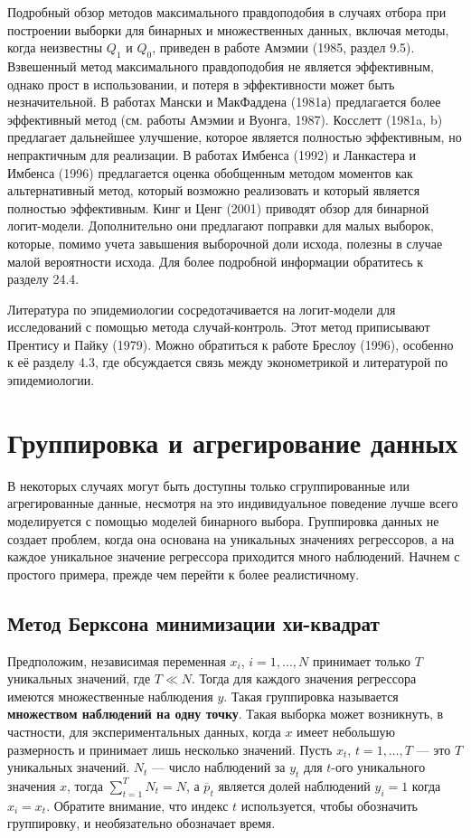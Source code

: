 Подробный обзор   методов максимального правдоподобия в случаях отбора при построении выборки для бинарных и множественных данных,  включая методы,  когда неизвестны $Q_1$ и $Q_0$,  приведен в работе Амэмии (1985,  раздел 9.5). Взвешенный метод максимального правдоподобия не является эффективным,  однако прост в использовании,  и потеря в эффективности может быть незначительной. В работах Мански и МакФаддена (1981а) предлагается более эффективный метод (см. работы Амэмии и Вуонга,  1987). Косслетт (1981a, b) предлагает дальнейшее улучшение,  которое является полностью эффективным,  но непрактичным для реализации. В работах Имбенса  (1992)  и Ланкастера и Имбенса  (1996)  предлагается оценка обобщенным методом моментов как альтернативный метод,  который возможно реализовать и который является полностью эффективным. Кинг и Ценг  (2001)  приводят обзор для бинарной логит-модели. Дополнительно они предлагают поправки для малых выборок, которые,  помимо учета завышения выборочной доли исхода, полезны  в случае малой вероятности исхода. Для более подробной информации обратитесь к разделу 24.4.

Литература по эпидемиологии сосредотачивается на логит-модели для исследований с помощью метода случай-контроль. Этот метод приписывают Прентису и Пайку  (1979). Можно обратиться к работе Бреслоу  (1996),  особенно к её разделу 4.3,  где обсуждается связь между эконометрикой и литературой по эпидемиологии.

\section{ Группировка и агрегирование данных}

В некоторых случаях могут быть доступны только сгруппированные или агрегированные данные,  несмотря на это индивидуальное поведение лучше всего моделируется с помощью моделей бинарного выбора. Группировка данных не создает проблем,  когда она основана на уникальных значениях регрессоров,  а на каждое уникальное значение регрессора приходится много наблюдений.  Начнем с простого примера,  прежде чем перейти к более реалистичному.

\subsection{Метод Берксона минимизации хи-квадрат}

Предположим,  независимая переменная $x_i$, $i=1, \ldots, N$ принимает только $T$ уникальных значений,  где $T\ll N$. Тогда для каждого значения регрессора имеются множественные наблюдения $y$. Такая группировка называется \textbf{множеством наблюдений на одну точку}. Такая выборка может возникнуть,  в частности,  для экспериментальных данных,  когда $x$ имеет небольшую размерность и принимает лишь несколько значений. Пусть $x_t$,  $t=1, \ldots,  T$ --- это  $T$ уникальных значений. $N_t$ --- число наблюдений за $y_t$ для $t$-ого уникального значения $x$,  тогда $\sum^T_{t=1} N_t=N$, а $\overline{p}_t$ является долей наблюдений $y_i=1$ когда $x_i=x_t$. Обратите внимание,  что индекс $t$ используется,  чтобы обозначить группировку,  и необязательно обозначает время.

